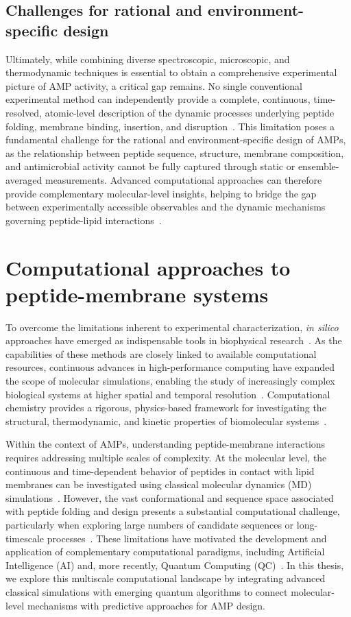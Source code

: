 \subsection{Challenges for rational and environment-specific design}

Ultimately, while combining diverse spectroscopic, microscopic, and thermodynamic techniques is essential to obtain a comprehensive experimental picture of AMP activity, a critical gap remains. No single conventional experimental method can independently provide a complete, continuous, time-resolved, atomic-level description of the dynamic processes underlying peptide folding, membrane binding, insertion, and disruption~\cite{general_1,afm_1,afm_2}. This limitation poses a fundamental challenge for the rational and environment-specific design of AMPs, as the relationship between peptide sequence, structure, membrane composition, and antimicrobial activity cannot be fully captured through static or ensemble-averaged measurements. Advanced computational approaches can therefore provide complementary molecular-level insights, helping to bridge the gap between experimentally accessible observables and the dynamic mechanisms governing peptide-lipid interactions~\cite{dror2012biomolecular}.


\section{Computational approaches to peptide-membrane systems}

To overcome the limitations inherent to experimental characterization, \textit{in silico} approaches have emerged as indispensable tools in biophysical research~\cite{dror2012biomolecular}. As the capabilities of these methods are closely linked to available computational resources, continuous advances in high-performance computing have expanded the scope of molecular simulations, enabling the study of increasingly complex biological systems at higher spatial and temporal resolution~\cite{Melo2023}. Computational chemistry provides a rigorous, physics-based framework for investigating the structural, thermodynamic, and kinetic properties of biomolecular systems~\cite{Karplus2002,Hollingsworth2018}.

Within the context of AMPs, understanding peptide-membrane interactions requires addressing multiple scales of complexity. At the molecular level, the continuous and time-dependent behavior of peptides in contact with lipid membranes can be investigated using classical molecular dynamics (MD) simulations~\cite{avances_3}. However, the vast conformational and sequence space associated with peptide folding and design presents a substantial computational challenge, particularly when exploring large numbers of candidate sequences or long-timescale processes~\cite{robert2021resource}. These limitations have motivated the development and application of complementary computational paradigms, including Artificial Intelligence (AI) and, more recently, Quantum Computing (QC)~\cite{avances_1,Jumper2021}. In this thesis, we explore this multiscale computational landscape by integrating advanced classical simulations with emerging quantum algorithms to connect molecular-level mechanisms with predictive approaches for AMP design.


